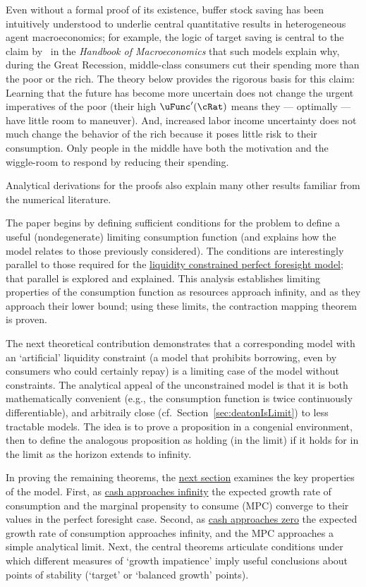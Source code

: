 \documentclass[BufferStockTheory]{subfiles}
\begin{document}
\hypertarget{KMP}{} Even without a formal proof of its existence, buffer stock saving has been intuitively understood to underlie central quantitative results in heterogeneous agent macroeconomics; for example, the logic of target saving is central to the claim by~\cite{kmpHandbook} in the \textit{Handbook of Macroeconomics} that such models explain why, during the Great Recession, middle-class consumers cut their spending more than the poor or the rich.  The theory below provides the rigorous basis for this claim:  Learning that the future has become more uncertain does not change the urgent imperatives of the poor (their high $\uFunc^{\prime}(\cRat)$ means they --- optimally --- have little room to maneuver).  And, increased labor income uncertainty does not much change the behavior of the rich because it poses little risk to their consumption.  Only people in the middle have both the motivation and the wiggle-room to respond by reducing their spending.

Analytical derivations for the proofs also explain many other results familiar from the numerical literature.

The paper begins by defining sufficient conditions for the problem to define a useful (nondegenerate) limiting consumption function (and explains how the model relates to those previously considered).  The conditions are interestingly parallel to those required for the \hyperlink{Factors-Defined-And-Compared}{liquidity constrained perfect foresight model}; that parallel is explored and explained.  This analysis establishes limiting properties of the consumption function as resources approach infinity, and as they approach their lower bound; using these limits, the contraction mapping theorem is proven.

The next theoretical contribution demonstrates that a corresponding model with an `artificial' liquidity constraint (a model that prohibits borrowing, even by consumers who could certainly repay) is a limiting case of the model without constraints. The analytical appeal of the unconstrained model is that it is both mathematically convenient (e.g., the consumption function is twice continuously differentiable), and arbitraily close (cf.\ Section~\ref{sec:deatonIsLimit}) to less tractable models. The idea is to prove a proposition in a congenial environment, then to define the analogous proposition as holding (in the limit) if it holds for in the limit as the horizon extends to infinity.

 In proving the remaining theorems, the \hyperlink{AnalysisoftheConvergedConsumptionFunction}{next section} examines the key properties of the model. First, as \hyperlink{LimitsAsmtToInfty}{cash approaches infinity} the expected growth rate of consumption and the marginal propensity to consume (MPC) converge to their values in the perfect foresight case. Second, as \hyperlink{LimitsAsmtToZero}{cash approaches zero} the expected growth rate of consumption approaches infinity, and the MPC approaches a simple analytical limit.  Next, the central theorems articulate conditions under which different measures of `growth impatience' imply useful conclusions about points of stability (`target' or `balanced growth' points).
\end{document}
